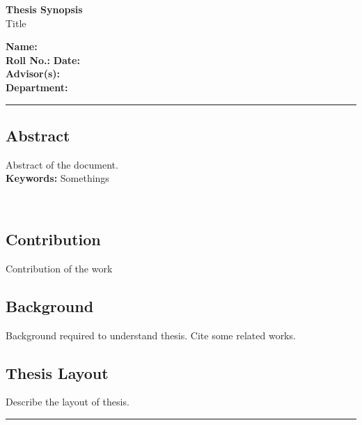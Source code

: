 \documentclass{article}
\begin{document}
    \begin{center}
        {\bfseries\Large Thesis Synopsis} \\ [2.5mm]
        {\large Title}
    \end{center}
    {\bf Name:} \\ [2mm]
    {\bf Roll No.:}
    \hfill {\bf Date:} \\ [2mm]
    {\bf Advisor(s):} \\ [2mm]
    {\bf Department:}
    \vspace{2mm}
    \hrule
    \begin{center}
    \subsection*{\centering Abstract}
    \begin{minipage}{0.85\textwidth}
        Abstract of the document. 
        \lipsum[1] \\ [1mm]
        {\bf Keywords:} Somethings
    \end{minipage} \\ [2mm]
    \end{center}

    \subsection*{Contribution}
    Contribution of the work

    \subsection*{Background}
    Background required to understand thesis. Cite some related works.
    \cite{Dosovitskiy2020AnII}

    \subsection*{Thesis Layout}
    Describe the layout of thesis.

    \vspace{2mm}
    \hrule
    \vspace{2mm}
    \printbibliography
\end{document}
